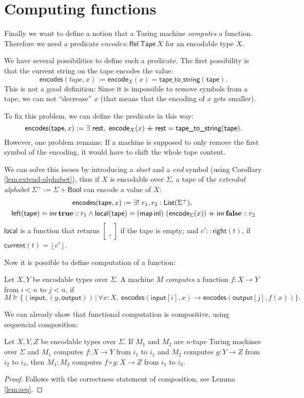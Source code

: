 \documentclass{psartcl}
\newcommand{\MS}[1]{\textsf{#1}}
\newcommand{\cons}{\mathbin{::}}
\newcommand\mdoubleplus{\ensuremath{\mathbin{+\mkern-10mu+}}}
\newcommand{\app}{\mdoubleplus}
\newcommand{\setOf}[1]{\bigl \{ #1 \bigr \}}
\newcommand{\setMap}[2]{\setOf{#1 \,\big|\, #2}}
\newcommand{\from}{:}
\renewcommand{\to}{\rightarrow}
\newcommand{\Bool}{\MS{Bool}}
\newcommand{\List}{\MS{List}}
\newcommand{\Some}[1]{\left\lfloor #1\right\rfloor}
\newcommand{\true}{\mathbf{true}}
\newcommand{\false}{\mathbf{false}}
\newcommand{\tape}[1]{[ #1 ]}
\newcommand{\tapePointer}[1]{\; \underset{\uparrow}{#1} \;}
\newcommand{\niltape}{\tape{\tapePointer{}}}
\newcommand{\Tape}{\MS{Tape}}
\newcommand{\Rel}{\mathsf{Rel}}
\newcommand{\mseq}{\mathbin{;}}
\DeclareMathOperator{\inl}{\ensuremath{\MS{inl}}}
\DeclareMathOperator{\inr}{\ensuremath{\MS{inr}}}
\begin{document}
\section{Computing functions}

Finally we want to define a notion that a Turing machine \emph{computes} a function.  Therefore we need a predicate $encodes : \Rel~\Tape~X$
for an encodable type $X$.

We have several possibilities to define such a predicate.  The first possibility is that the current string on the tape encodes the value:
$$\MS{encodes}(tape, x) := \MS{encode}_X(x) = \MS{tape\_to\_string}(\MS{tape}).$$
This is not a good definition: Since it is impossible to remove symbols from a tape, we can not ``decrease'' $x$ (that means that the encoding of
$x$ gets smaller).

To fix this problem, we can define the predicate in this way:
$$\MS{encodes}(\MS{tape}, x) := \exists~\MS{rest},~\MS{encode}_X(x) \app \MS{rest} = \MS{tape\_to\_string}(\MS{tape}).$$
However, one problem remains:  If a machine is supposed to only remove the first symbol of the encoding, it would have to shift the whole tape
content.

We can solve this issues by introducing a \emph{start} and a \emph{end} symbol (using Corollary \ref{lem:extend-alphabet}), thus if $X$ is
encodable over $\Sigma$, a tape of the \emph{extended alphabet} $\Sigma^+ := \Sigma + \Bool$ can encode a value of $X$:
\begin{multline*}
  \MS{encodes}(\MS{tape},x) := \exists!~r_1, r_2 : \List(\Sigma^+),~\\
  \MS{left}(\MS{tape}) = \inr \true \cons r_1 \land
  \MS{local}(\MS{tape}) = (\MS{map} \inl)~(\MS{encode}_\Sigma(x)) \app \inr \false \cons r_2
\end{multline*}
$\MS{local}$ is a function that returns $\niltape$ if the tape is empty; and $c' \cons \MS{right}(t)$, if $\MS{current}(t) = \Some{c'}$.

Now it is possible to define computation of a function:
\begin{definition}
  \label{def:computes}
  Let $X, Y$ be encodable types over $\Sigma$.  A machine $M$ \emph{computes} a function $f \from X \to Y$ from $i < n$ to $j < n$, if
  $$M \VDash \setMap{(\MS{input}, (y, \MS{output}))}{\forall x:X,~ \MS{encodes}(\MS{input}[i], x) \rightarrow \MS{encodes}(\MS{output}[j], f(x))}.$$
\end{definition}

We can already show that functional computation is compositive, using sequencial composition:
\begin{lemma}
  \label{lem:computes-composes}
  Let $X, Y, Z$ be encodable types over $\Sigma$.  If $M_1$ and $M_2$ are $n$-tape Turing machines over $\Sigma$ and $M_1$ computes
  $f \from X \to Y$ from $i_1$ to $i_1$ and $M_2$ computes $g \from Y \to Z$ from $i_2$ to $i_3$,
  then $M_1 \mseq M_2$ computes $f \circ g \from X \to Z$ from $i_1$ to $i_3$.
\end{lemma}
\begin{proof}
  Follows with the correctness statement of composition, see Lemma \ref{lem:seq}.
\end{proof}
\end{document}
